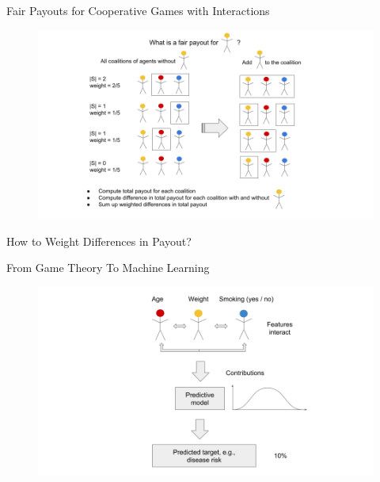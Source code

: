 \documentclass[11pt,compress,t,notes=noshow, aspectratio=169, xcolor=table]{beamer}
\begin{document}
\begin{vbframe}{Fair Payouts for Cooperative Games with Interactions}

\begin{figure}
    \centering
    \includegraphics{slides/shapley/figure/Shapley_4.png}
\end{figure}

\end{vbframe}

\begin{vbframe}{How to Weight Differences in Payout?}

\end{vbframe}

\begin{vbframe}{From Game Theory To Machine Learning}

\begin{figure}
    \centering
    \includegraphics{slides/shapley/figure/Shapley_5.png}
\end{figure}

\end{vbframe}
\end{document}
